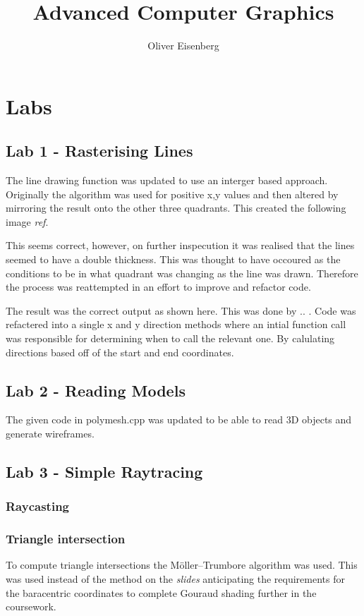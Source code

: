 \documentclass{article}
\begin{document}
\title{Advanced Computer Graphics}
\author{Oliver Eisenberg}
\maketitle
\twocolumn
\section{Labs}
\subsection{Lab 1 - Rasterising Lines}
The line drawing function was updated to use an interger based approach. Originally the algorithm was used for positive x,y values and then altered by mirroring the result onto the other three quadrants. This created the following image \textit{ref}. 

This seems correct, however, on further inspecution it was realised that the lines seemed to have a double thickness. This was thought to have occoured as the conditions to be in what quadrant was changing as the line was drawn. Therefore the process was reattempted in an effort to improve and refactor code.

The result was the correct output as shown here. This was done by .. . Code was refactered into a single x and y direction methods where an intial function call was responsible for determining when to call the relevant one. By calulating directions based off of the start and end coordinates.
\subsection{Lab 2 - Reading Models}
The given code in polymesh.cpp was updated to be able to read 3D objects and generate wireframes.

\subsection{Lab 3 - Simple Raytracing}
\subsubsection{Raycasting }
\subsubsection{Triangle intersection}
To compute triangle intersections the Möller–Trumbore algorithm was used. This was used instead of the method on the \textit{slides} anticipating the requirements for the baracentric coordinates to complete Gouraud shading further in the coursework.
\end{document}
